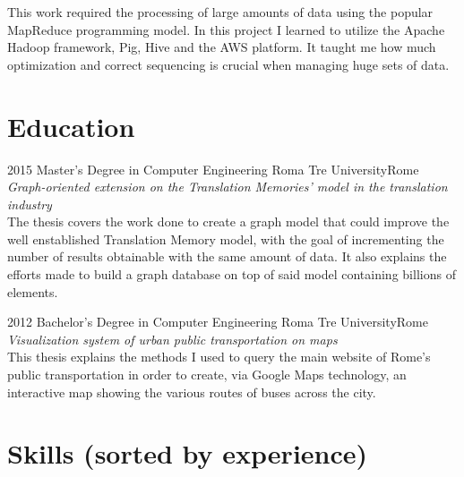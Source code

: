 \documentclass[11pt,a4paper,sans]{moderncv} %
\begin{document}

{This work required the processing of large amounts of data using the popular MapReduce programming model. In this project I learned to utilize the Apache Hadoop framework, Pig, Hive and the AWS platform. It taught me how much optimization and correct sequencing is crucial when managing huge sets of data.}


\section{Education}

\cventry
{2015}
{Master's Degree in Computer Engineering}
{Roma Tre University}{Rome}
{}
{\emph{\normalsize {Graph-oriented extension on the Translation Memories' model in the translation industry}}\\
The thesis covers the work done to create a graph model that could improve the well enstablished Translation Memory model, with the goal of incrementing the number of results obtainable with the same amount of data. It also explains the efforts made to build a graph database on top of said model containing billions of elements.}

\cventry
{2012}
{Bachelor's Degree in Computer Engineering}
{Roma Tre University}{Rome}
{}
{\emph{\normalsize {Visualization system of urban public transportation on maps}}\\
This thesis explains the methods I used to query the main website of Rome's public transportation in order to create, via Google Maps technology, an interactive map showing the various routes of buses across the city.}


\newpage{}

\section{Skills (sorted by experience)}

\end{document}
